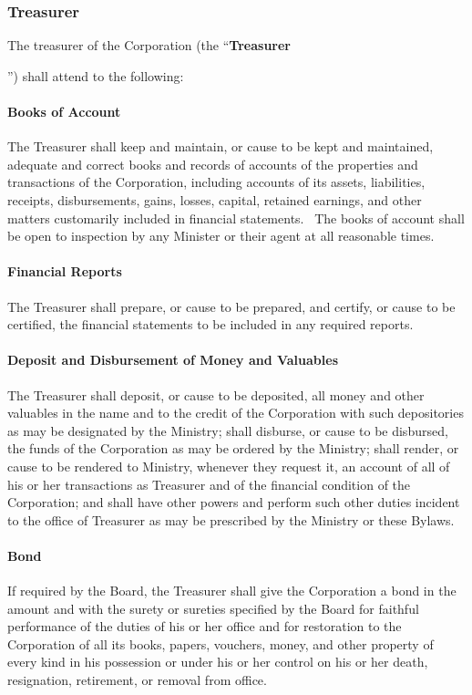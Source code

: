 \documentclass[letterpaper,titlepage]{article}
\newcommand{\defn}[1]{\refstepcounter{defn}\textbf{#1}\addcontentsline{defn}{defn}{\protect\numberline{\thedefn}#1}}
\begin{document}
\subsubsection{Treasurer}
\label{sec:treasurer}
The treasurer of the Corporation (the ``\defn{Treasurer}'') shall attend to the
following:
\paragraph{Books of Account}
The Treasurer shall keep and maintain, or cause to be kept and maintained,
adequate and correct books and records of accounts of the properties and
transactions of the Corporation, including accounts of its assets, liabilities,
receipts, disbursements, gains, losses, capital, retained earnings, and other
matters customarily included in financial statements.  The books of account
shall be open to inspection by any Minister or their agent at all reasonable
times.
\paragraph{Financial Reports}
The Treasurer shall prepare, or cause to be prepared, and certify, or cause to
be certified, the financial statements to be included in any required reports.
\paragraph{Deposit and Disbursement of Money and Valuables}
The Treasurer shall deposit, or cause to be deposited, all money and other
valuables in the name and to the credit of the Corporation with such
depositories as may be designated by the Ministry; shall disburse, or cause to
be disbursed, the funds of the Corporation as may be ordered by the Ministry;
shall render, or cause to be rendered to Ministry, whenever they request it, an
account of all of his or her transactions as Treasurer and of the financial
condition of the Corporation; and shall have other powers and perform such
other duties incident to the office of Treasurer as may be prescribed by the
Ministry or these Bylaws.
\paragraph{Bond}
If required by the Board, the Treasurer shall give the Corporation a bond in
the amount and with the surety or sureties specified by the Board for faithful
performance of the duties of his or her office and for restoration to the
Corporation of all its books, papers, vouchers, money, and other property of
every kind in his possession or under his or her control on his or her death,
resignation, retirement, or removal from office.
\end{document}
